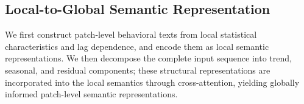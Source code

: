\documentclass[letterpaper]{article} %
\begin{document}

\subsection{Local-to-Global Semantic Representation}
We first construct patch-level behavioral texts from local statistical characteristics and lag dependence, and encode them as local semantic representations. We then decompose the complete input sequence into trend, seasonal, and residual components; these structural representations are incorporated into the local semantics through cross-attention, yielding globally informed patch-level semantic representations.
\end{document}
